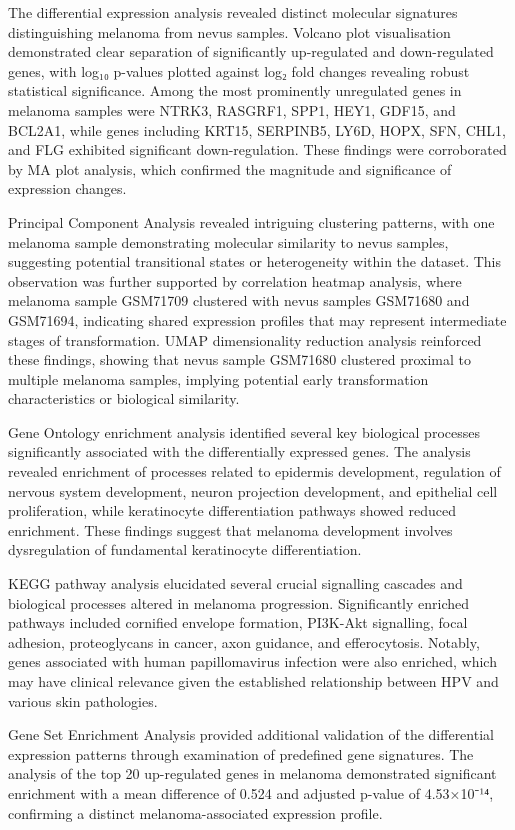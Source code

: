 \documentclass[
]{article}
\begin{document}
The differential expression analysis revealed distinct molecular
signatures distinguishing melanoma from nevus samples. Volcano plot
visualisation demonstrated clear separation of significantly
up-regulated and down-regulated genes, with log₁₀ p-values plotted
against log₂ fold changes revealing robust statistical significance.
Among the most prominently unregulated genes in melanoma samples were
NTRK3, RASGRF1, SPP1, HEY1, GDF15, and BCL2A1, while genes including
KRT15, SERPINB5, LY6D, HOPX, SFN, CHL1, and FLG exhibited significant
down-regulation. These findings were corroborated by MA plot analysis,
which confirmed the magnitude and significance of expression changes.

Principal Component Analysis revealed intriguing clustering patterns,
with one melanoma sample demonstrating molecular similarity to nevus
samples, suggesting potential transitional states or heterogeneity
within the dataset. This observation was further supported by
correlation heatmap analysis, where melanoma sample GSM71709 clustered
with nevus samples GSM71680 and GSM71694, indicating shared expression
profiles that may represent intermediate stages of transformation. UMAP
dimensionality reduction analysis reinforced these findings, showing
that nevus sample GSM71680 clustered proximal to multiple melanoma
samples, implying potential early transformation characteristics or
biological similarity.

Gene Ontology enrichment analysis identified several key biological
processes significantly associated with the differentially expressed
genes. The analysis revealed enrichment of processes related to
epidermis development, regulation of nervous system development, neuron
projection development, and epithelial cell proliferation, while
keratinocyte differentiation pathways showed reduced enrichment. These
findings suggest that melanoma development involves dysregulation of
fundamental keratinocyte differentiation.

KEGG pathway analysis elucidated several crucial signalling cascades and
biological processes altered in melanoma progression. Significantly
enriched pathways included cornified envelope formation, PI3K-Akt
signalling, focal adhesion, proteoglycans in cancer, axon guidance, and
efferocytosis. Notably, genes associated with human papillomavirus
infection were also enriched, which may have clinical relevance given
the established relationship between HPV and various skin pathologies.

Gene Set Enrichment Analysis provided additional validation of the
differential expression patterns through examination of predefined gene
signatures. The analysis of the top 20 up-regulated genes in melanoma
demonstrated significant enrichment with a mean difference of 0.524 and
adjusted p-value of 4.53×10⁻¹⁴, confirming a distinct
melanoma-associated expression profile.
\end{document}
